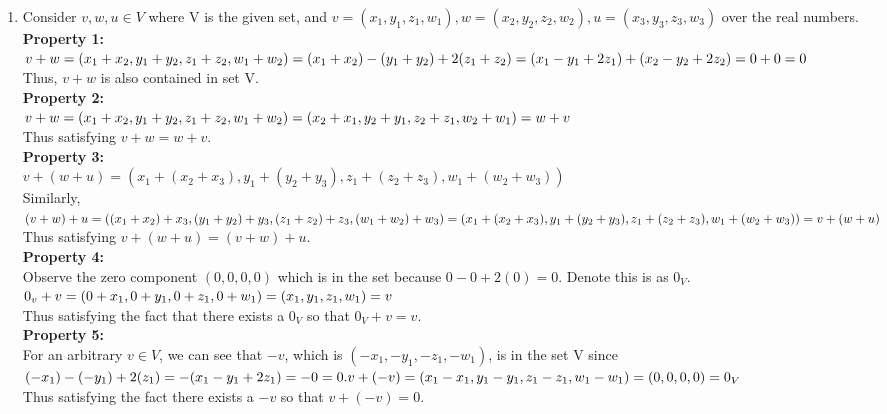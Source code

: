 \documentclass{article}
\begin{document}
\begin{enumerate}
\begin{enumerate}
\item Consider $v,w, u \in V$ where V is the given set, and $ v = (x_1,y_1,z_1,w_1), w = (x_2,y_2,z_2,w_2), u = (x_3,y_3,z_3,w_3)$ over the real numbers. \\
\textbf{Property 1:} \\ $v + w = (x_1 + x_2, y_1 + y_2, z_1 + z_2, w_1 + w_2) \\ = (x_1 + x_2) - (y_1 + y_2) + 2(z_1 + z_2) \\ = (x_1 - y_1 + 2z_1) + (x_2 - y_2 + 2z_2) \\ = 0 + 0 = 0$ \\ Thus, $v+w$ is also contained in set V. \\
\textbf{Property 2:} \\ $v + w = (x_1 + x_2, y_1 + y_2, z_1 + z_2, w_1 + w_2) \\ = (x_2 + x_1, y_2 + y_1, z_2 + z_1, w_2 + w_1) \\ = w + v$ \\ Thus satisfying $v + w = w + v$. \\
\textbf{Property 3:} \\ $v + (w + u) = (x_1 + (x_2 + x_3), y_1 + (y_2 + y_3), z_1 + (z_2 + z_3), w_1 + (w_2 + w_3))$ \\ Similarly, \\ $(v + w) + u = ((x_1 + x_2) + x_3, (y_1 + y_2) + y_3, (z_1 + z_2) + z_3, (w_1 + w_2) + w_3)\\ = (x_1 + (x_2 + x_3), y_1 + (y_2 + y_3), z_1 + (z_2 + z_3), w_1 + (w_2 + w_3)) \\ = v + (w + u)$ \\ Thus satisfying $v + (w + u) = (v + w) + u$. \\
\textbf{Property 4:} \\ Observe the zero component $(0,0,0,0)$ which is in the set because $0 - 0 + 2(0) = 0$. Denote this is as $0_V$. \\ $0_v + v = (0 + x_1, 0 + y_1, 0 + z_1, 0 + w_1) \\
= (x_1, y_1, z_1, w_1) = v$ \\ Thus satisfying the fact that there exists a $0_V$ so that $0_V + v = v$. \\ 
\textbf{Property 5:} \\ For an arbitrary $v \in V$, we can see that $-v$, which is $(-x_1, -y_1, -z_1, -w_1)$, is in the set V since $(-x_1) - (-y_1) + 2(z_1) = -(x_1 - y_1 + 2z_1) = -0 = 0. \\ v + (-v) = (x_1 - x_1, y_1 - y_1, z_1 - z_1, w_1 - w_1) \\ = (0,0,0,0) = 0_V$ \\ Thus satisfying the fact there exists a $-v$ so that $v + (-v) = 0$. \\

\end{enumerate}
\end{enumerate}
\end{document}
